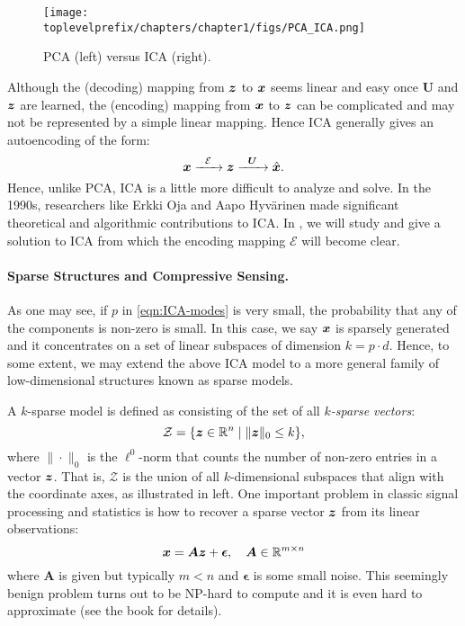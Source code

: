 \documentclass[../../book-main.tex]{subfiles}
\begin{document}
\begin{figure}
    \centering
    \texttt{[image: \\toplevelprefix/chapters/chapter1/figs/PCA\_ICA.png]}
    \caption{PCA (left) versus ICA (right).}
    \label{fig:ICA-PCA}
\end{figure}

Although the (decoding) mapping from $\bm{z}$ to $\bm{x}$ seems linear and easy once $\boldsymbol{U}$ and $\bm{z}$ are learned, the (encoding) mapping from $\bm{x}$ to $\bm{z}$ can be complicated and may not be represented by a simple linear mapping. Hence ICA generally gives an autoencoding of the form:
\begin{equation}
    \bm{x}   \xrightarrow{\hspace{2mm} \mathcal{E}\hspace{2mm}} \bm{z}  \xrightarrow{\hspace{2mm} \boldsymbol{U} \hspace{2mm}} \hat {\bm{x}}.
       \label{eqn:auto-encoding-ICA}
\end{equation}
Hence, unlike PCA, ICA is a little more difficult to analyze and solve. In the 1990s, researchers like Erkki Oja and Aapo Hyv\"{a}rinen \cite{hyvarinen-1997,Hyvrinen-2000} made significant theoretical and algorithmic contributions to ICA. In , we will study and give a solution to ICA from which the encoding mapping $\mathcal{E}$ will become clear.



\paragraph{Sparse Structures and Compressive Sensing.}
As one may see, if $p$ in \eqref{eqn:ICA-modes} is very small, the probability that any of the components is non-zero is small. In this case, we say $\bm{x}$ is sparsely generated and it concentrates on a set of linear subspaces of dimension $k = p \cdot d$. Hence, to some extent, we may extend the above ICA model to a more general family of low-dimensional structures known as sparse models. 

A $k$-sparse model is defined as consisting of the set of all {\em $k$-sparse vectors}:
\begin{equation}
    \mathcal{Z} = \{\bm{z} \in \mathbb{R}^n \mid \|\bm{z}\|_0 \le k\},
\end{equation}
where $\| \cdot \|_0$ is the $\ell^0$-norm that counts the number of non-zero entries in a vector $\bm{z}$. That is, $\mathcal{Z}$ is the union of all $k$-dimensional subspaces that align with the coordinate axes, as illustrated in  left. One important problem in classic signal processing and statistics is how to recover a sparse vector $\bm{z}$ from its linear observations:
\begin{equation}
    \bm{x} = \boldsymbol{A} \bm{z} + \boldsymbol{\epsilon}, \quad \boldsymbol{A} \in \mathbb{R}^{m\times n}
    \label{eqn:sparse-model}
\end{equation}
where $\boldsymbol{A}$ is given but typically $m < n$ and $\boldsymbol{\epsilon}$ is some small noise. This seemingly benign problem turns out to be NP-hard to compute and it is even hard to approximate (see the book \cite{Wright-Ma-2022} for details). 
\end{document}
